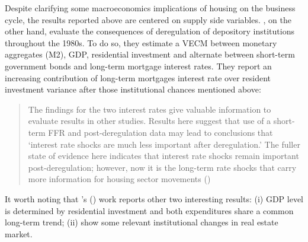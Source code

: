 \documentclass[11pt]{article}
\begin{document}
Despite clarifying some macroeconomics  implications of housing on the business cycle, the results reported above are centered on supply side variables.
\textcite{gauger_residential_2003}, on the other hand, evaluate the consequences of deregulation of depository institutions throughout the 1980s.
To do so, they estimate a VECM between monetary aggregates (M2), GDP, residential investment and alternate between short-term government bonds and long-term mortgage interest rates. 
They report an increasing contribution of long-term mortgages interest rate over resident investment variance after those institutional chances mentioned above:

\begin{quote}
The findings for the two interest rates give valuable information to evaluate results in other studies. Results here suggest that use of a short-term FFR and post-deregulation data may lead to conclusions that `interest rate shocks are much less important after deregulation.' The fuller state of evidence here indicates that interest rate shocks remain important post-deregulation; however, now it is the long-term rate shocks that carry more information for housing sector movements (\cite[p.~346]{gauger_residential_2003})
\end{quote}
It worth noting that \citeauthor{gauger_residential_2003}'s (\citeyear{gauger_residential_2003}) work reports other two interesting results:
	(i) GDP level is determined by residential investment and both expenditures share a common long-term trend;
	(ii) show some relevant institutional changes in real estate market.
\end{document}
